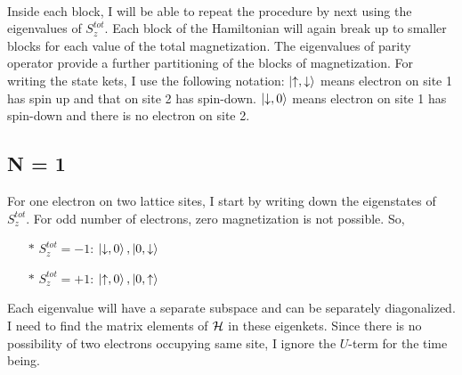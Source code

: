 \documentclass[12pt]{article}
\begin{document}
\paragraph{}
Inside each block, I will be able to repeat the procedure by next using the eigenvalues of \(S_z^{tot}\). Each block of the Hamiltonian will again break up to smaller blocks for each value of the total magnetization. The eigenvalues of parity operator provide a further partitioning of the blocks of magnetization. For writing the state kets, I use the following notation: \(\ket{\uparrow,\downarrow}\) means electron on site 1 has spin up and that on site 2 has spin-down. \(\ket{\downarrow, 0}\) means electron on site 1 has spin-down and there is no electron on site 2.

\subsection{N = 1}

\pp For one electron on two lattice sites, I start by writing down the eigenstates of \(S_z^{tot}\). For odd number of electrons, zero magnetization is not possible. So,
\begin{itemize}
	\item[$\ast$] \(S_z^{tot} = -1\): \(\ket{\downarrow,0}, \ket{0, \downarrow}\)
	\item[$\ast$] \(S_z^{tot} = +1\): \(\ket{\uparrow,0}, \ket{0, \uparrow}\)
\end{itemize}
Each eigenvalue will have a separate subspace and can be separately diagonalized. I need to find the matrix elements of \(\mathcal{H}\) in these eigenkets. Since there is no possibility of two electrons occupying same site, I ignore the \(U\)-term for the time being.
\end{document}
